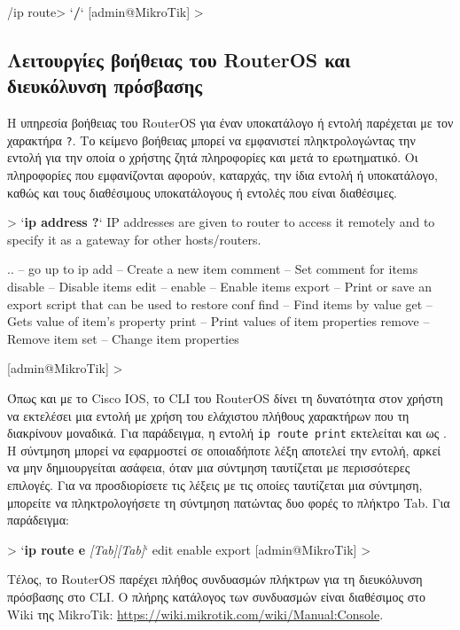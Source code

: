 \documentclass{EdipyLabs} %
\begin{document}
\begin{CommandBox}
 /ip route> `\textbf{/}`
[admin@MikroTik] >
\end{CommandBox}

\subsection{Λειτουργίες βοήθειας του RouterOS και διευκόλυνση πρόσβασης}
Η υπηρεσία βοήθειας του RouterOS για έναν υποκατάλογο ή εντολή παρέχεται με τον χαρακτήρα \texttt{?}. Το κείμενο βοήθειας μπορεί να εμφανιστεί πληκτρολογώντας την εντολή για την οποία ο χρήστης ζητά πληροφορίες και μετά το ερωτηματικό. Οι πληροφορίες που εμφανίζονται αφορούν, καταρχάς, την ίδια εντολή ή υποκατάλογο, καθώς και τους διαθέσιμους υποκατάλογους ή εντολές που είναι διαθέσιμες. 

\begin{CommandBox}
 > `\textbf{ip address ?}`
IP addresses are given to router to access it remotely and to specify it as a gateway for other hosts/routers.

.. -- go up to ip
add -- Create a new item
comment -- Set comment for items
disable -- Disable items
edit -- 
enable -- Enable items
export -- Print or save an export script that can be used to restore conf
find -- Find items by value
get -- Gets value of item's property
print -- Print values of item properties
remove -- Remove item
set -- Change item properties

[admin@MikroTik] >
\end{CommandBox}

Όπως και με το Cisco IOS, το CLI του RouterOS δίνει τη δυνατότητα στον χρήστη να εκτελέσει μια εντολή με χρήση του ελάχιστου πλήθους χαρακτήρων που τη διακρίνουν μοναδικά. Για παράδειγμα, η εντολή \texttt{ip route print} εκτελείται και ως . H σύντμηση μπορεί να εφαρμοστεί σε οποιαδήποτε λέξη αποτελεί την εντολή, αρκεί να μην δημιουργείται ασάφεια, όταν μια σύντμηση ταυτίζεται με περισσότερες επιλογές. Για να προσδιορίσετε τις λέξεις με τις οποίες ταυτίζεται μια σύντμηση, μπορείτε να πληκτρολογήσετε τη σύντμηση πατώντας δυο φορές το πλήκτρο Tab. Για παράδειγμα:

\begin{CommandBox}
 > `\textbf{ip route e} \textit{[Tab][Tab]}`
edit  enable  export
[admin@MikroTik] >
\end{CommandBox}

Τέλος, το RouterOS παρέχει πλήθος συνδυασμών πλήκτρων για τη διευκόλυνση πρόσβασης στο CLI. Ο πλήρης κατάλογος των συνδυασμών είναι διαθέσιμος στο Wiki της MikroTik: \url{https://wiki.mikrotik.com/wiki/Manual:Console}.
\end{document}
